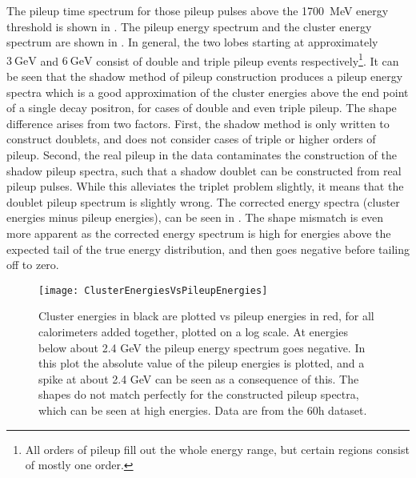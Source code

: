 The pileup time spectrum for those pileup pulses above the \SI{1700}{\MeV} energy threshold is shown in . The pileup energy spectrum and the cluster energy spectrum are shown in . In general, the two lobes starting at approximately $\SI{3}{\GeV}$ and $\SI{6}{\GeV}$ consist of double and triple pileup events respectively\footnote{All orders of pileup fill out the whole energy range, but certain regions consist of mostly one order.}. It can be seen that the shadow method of pileup construction produces a pileup energy spectra which is a good approximation of the cluster energies above the end point of a single decay positron, for cases of double and even triple pileup. The shape difference arises from two factors. First, the shadow method is only written to construct doublets, and does not consider cases of triple or higher orders of pileup. Second, the real pileup in the data contaminates the construction of the shadow pileup spectra, such that a shadow doublet can be constructed from real pileup pulses. While this alleviates the triplet problem slightly, it means that the doublet pileup spectrum is slightly wrong. The corrected energy spectra (cluster energies minus pileup energies), can be seen in . The shape mismatch is even more apparent as the corrected energy spectrum is high for energies above the expected tail of the true energy distribution, and then goes negative before tailing off to zero. 



    \begin{figure}
        \centering
        \texttt{[image: ClusterEnergiesVsPileupEnergies]}
        \caption[Cluster energies vs pileup energies]{Cluster energies in black are plotted vs pileup energies in red, for all calorimeters added together, plotted on a log scale. At energies below about 2.4 GeV the pileup energy spectrum goes negative. In this plot the absolute value of the pileup energies is plotted, and a spike at about 2.4 GeV can be seen as a consequence of this. The shapes do not match perfectly for the constructed pileup spectra, which can be seen at high energies. Data are from the 60h dataset.}    
        \label{fig:ClusterEnergiesVsPileupEnergies}
    \end{figure}


